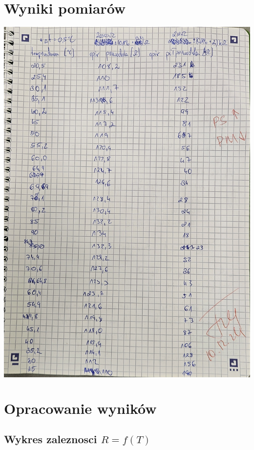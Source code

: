 \documentclass[a4paper, 11pt]{article}
\begin{document}
\section{Wyniki pomiarów}\label{sec:wyniki_pomiarow} %
\includegraphics[scale=0.2]{images/pomiary.jpg}
\pagebreak

\section{Opracowanie wyników}\label{sec:opracowanie_wynikow} %

\subsection{Wykres zaleznosci $R = f(T)$}\label{sub:wykres_zaleznosci_r_f_t_} %
\end{document}
